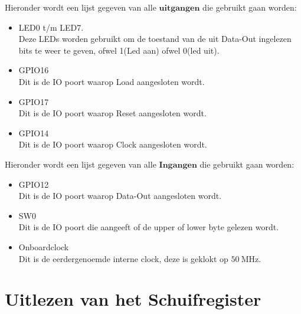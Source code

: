 Hieronder wordt een lijst gegeven van alle $\boldsymbol{uitgangen}$ die gebruikt gaan worden:
\begin{itemize}
	\item LED0 t/m  LED7.\\
	Deze LEDs worden gebruikt om de toestand van de uit Data-Out ingelezen bits te weer te geven, ofwel 1(Led aan) ofwel 0(led uit).
	\item GPIO16\\
	Dit is de IO poort waarop Load aangesloten wordt.
	\item GPIO17\\
	Dit is de IO poort waarop Reset aangesloten wordt.
	\item GPIO14\\
	Dit is de IO poort waarop Clock aangesloten wordt.

\end{itemize}

Hieronder wordt een lijst gegeven van alle $\boldsymbol{Ingangen}$ die gebruikt gaan worden:
\begin{itemize}
		\item GPIO12\\
		Dit is de IO poort waarop Data-Out aangesloten wordt.
		\item SW0\\
		Dit is de IO poort die aangeeft of de upper of lower byte gelezen wordt.
		\item Onboardclock\\
		Dit is de eerdergenoemde interne clock, deze is geklokt op $\SI{50}{\mega\hertz} $. 
\end{itemize}


\section{Uitlezen van het Schuifregister}

